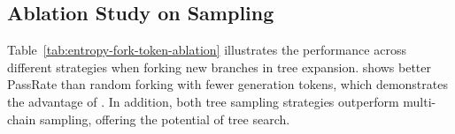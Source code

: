 

\subsection{Ablation Study on \treemodel Sampling}
 Table~\ref{tab:entropy-fork-token-ablation} illustrates the performance across different strategies when forking new branches in tree expansion. 
\treemodel shows better PassRate than random forking with fewer generation tokens, which demonstrates the advantage of \treemodel. In addition, both tree sampling strategies outperform multi-chain sampling, offering the potential of tree search.

